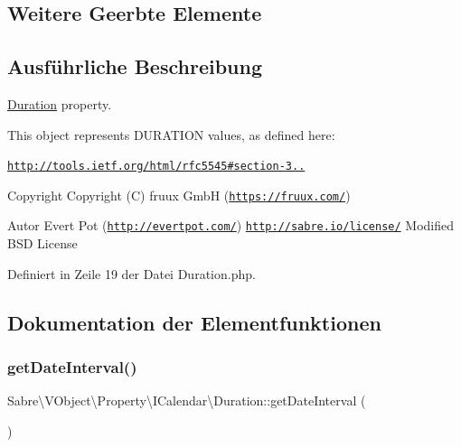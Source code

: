 \subsection*{Weitere Geerbte Elemente}


\subsection{Ausführliche Beschreibung}
\mbox{\hyperlink{class_sabre_1_1_v_object_1_1_property_1_1_i_calendar_1_1_duration}{Duration}} property.

This object represents D\+U\+R\+A\+T\+I\+ON values, as defined here\+:

\href{http://tools.ietf.org/html/rfc5545#section-3.3.6}{\tt http\+://tools.\+ietf.\+org/html/rfc5545\#section-\/3..}

\begin{DoxyCopyright}{Copyright}
Copyright (C) fruux GmbH (\href{https://fruux.com/}{\tt https\+://fruux.\+com/}) 
\end{DoxyCopyright}
\begin{DoxyAuthor}{Autor}
Evert Pot (\href{http://evertpot.com/}{\tt http\+://evertpot.\+com/})  \href{http://sabre.io/license/}{\tt http\+://sabre.\+io/license/} Modified B\+SD License 
\end{DoxyAuthor}


Definiert in Zeile 19 der Datei Duration.\+php.



\subsection{Dokumentation der Elementfunktionen}
\mbox{\label{class_sabre_1_1_v_object_1_1_property_1_1_i_calendar_1_1_duration_ab97ada3c1d6a9becbb9477ec73a9a764}} 
\subsubsection{\texorpdfstring{get\+Date\+Interval()}{getDateInterval()}}
{\footnotesize\ttfamily Sabre\textbackslash{}\+V\+Object\textbackslash{}\+Property\textbackslash{}\+I\+Calendar\textbackslash{}\+Duration\+::get\+Date\+Interval (\begin{DoxyParamCaption}{ }\end{DoxyParamCaption})}

